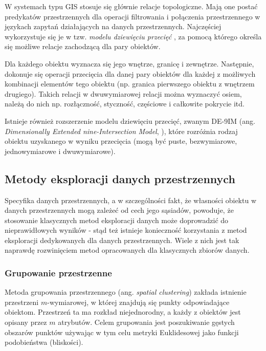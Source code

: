 \documentclass[12pt]{article}
\begin{document}
W systemach typu GIS stosuje się głównie relacje topologiczne. Mają one postać predykatów przestrzennych dla operacji filtrowania i połączenia przestrzennego w językach zapytań działających na danych przestrzennych. Najczęściej wykorzystuje się je w tzw. \textit{modelu dziewięciu przecięć} \cite{9sec}, za pomocą którego określa się możliwe relacje zachodzącą dla pary obiektów.

Dla każdego obiektu wyznacza się jego wnętrze, granicę i zewnętrze. Następnie, dokonuje się operacji przecięcia dla danej pary obiektów dla każdej z możliwych kombinacji elementów tego obiektu (np. granica pierwszego obiektu z wnętrzem drugiego). Takich relacji w dwuwymiarowej relacji można wyznaczyć osiem, należą do nich np. rozłączność, styczność, częściowe i całkowite pokrycie itd. 

Istnieje również rozszerzenie modelu dziewięciu przecięć, zwanym DE-9IM (ang. \textit{Dimensionally Extended nine-Intersection Model}, \cite{9sec2}), które rozróżnia rodzaj obiektu uzyskanego w wyniku przecięcia (mogą być puste, bezwymiarowe, jednowymiarowe i dwuwymiarowe). 

\subsection{Metody eksploracji danych przestrzennych}

Specyfika danych przestrzennych, a w szczególności fakt, że własności obiektu w danych przestrzennych mogą zależeć od cech jego sąsiadów, powoduje, że stosowanie klasycznych metod eksploracji danych może doprowadzić do nieprawidłowych wyników \cite{klasykchuj1} \cite{klasykchuj2} - stąd też istnieje konieczność korzystania z metod eksploracji dedykowanych dla danych przestrzennych. Wiele z nich jest tak naprawdę rozwinięciem metod opracowanych dla klasycznych zbiorów danych.

\subsubsection{Grupowanie przestrzenne}

Metoda grupowania przestrzennego (ang. \textit{spatial clustering}) zakłada istnienie przestrzeni $m$-wymiarowej, w której znajdują się punkty odpowiadające obiektom. Przestrzeń ta ma rozkład niejednorodny, a każdy z obiektów jest opisany przez $m$ atrybutów. Celem grupowania jest poszukiwanie gęstych obszarów punktów używając w tym celu metryki Euklidesowej jako funkcji podobieństwa (bliskości). 
\end{document}
